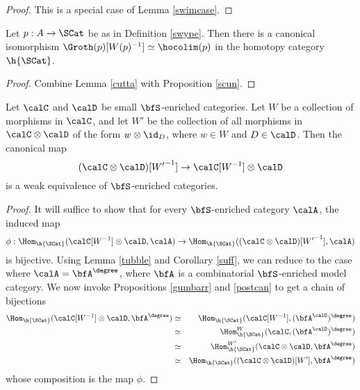 \begin{proof}
This is a special case of Lemma \ref{swimcase}. 
\end{proof}

\begin{lemma}\label{toopa}
Let $p: A \rightarrow \SCat$ be as in Definition \ref{swype}. Then
there is a canonical isomorphism $\Groth(p)[ W(p)^{-1} ] \simeq \hocolim(p)$
in the homotopy category $\h{\SCat}$.
\end{lemma}

\begin{proof}
Combine Lemma \ref{cutta} with Proposition \ref{scun}.
\end{proof}

\begin{lemma}\label{twoface}
Let $\calC$ and $\calD$ be small $\bfS$-enriched categories.
Let $W$ be a collection of morphisms in $\calC$, and let
$W'$ be the collection of all morphisms in $\calC \otimes \calD$ of the form
$w \otimes \id_{D}$, where $w \in W$ and $D \in \calD$. Then the canonical map
$$ ( \calC \otimes \calD )[ {W'}^{-1} ] \rightarrow \calC[W^{-1}] \otimes \calD$$
is a weak equivalence of $\bfS$-enriched categories.
\end{lemma}

\begin{proof}
It will suffice to show that for every $\bfS$-enriched category $\calA$, 
the induced map
$$ \phi: \Hom_{ \h{\SCat} }( \calC[W^{-1}] \otimes \calD, \calA) \rightarrow
\Hom_{ \h{\SCat} }( ( \calC \otimes \calD)[ {W'}^{-1} ], \calA) $$
is bijective. Using Lemma \ref{tubble} and Corollary \ref{suff}, we can reduce
to the case where $\calA = \bfA^{\degree}$, where $\bfA$ is a combinatorial $\bfS$-enriched
model category. We now invoke Propositions \ref{gumbarr} and \ref{postcan} to get a chain of bijections
\begin{eqnarray*}
\Hom_{ \h{\SCat} }( \calC[W^{-1}] \otimes \calD, \bfA^{\degree}) & \simeq &
\Hom_{\h{\SCat} }( \calC[W^{-1}], ( \bfA^{\calD} )^{\degree} ) \\
& \simeq & \Hom_{\h{\SCat}}^{W}( \calC, ( \bfA^{\calD} )^{\degree} ) \\
& \simeq & \Hom_{\h{\SCat}}^{W'}( \calC \otimes \calD, \bfA^{\degree} ) \\
& \simeq & \Hom_{\h{\SCat}}( (\calC \otimes \calD)[W'], \bfA^{\degree} )
\end{eqnarray*}
whose composition is the map $\phi$.
\end{proof}

